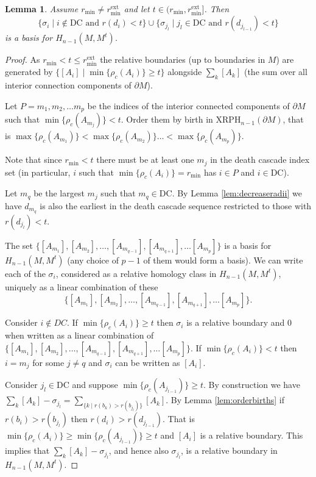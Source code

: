 \documentclass[a4paper,11pt]{article}
\newtheorem{lemma}[theorem]{Lemma}
\theoremstyle{definition}
\newcommand{\DC}{\text{DC}}
\newcommand{\ext}{\text{ext}}
\begin{document}
\begin{lemma}\label{lem:relativebasissmall}
Assume $r_{\min} \neq r_{\min}^{\ext}$ and let $t\in (r_{\min}, r_{\min}^{\ext}]$. Then $$\{\sigma_i \mid i\notin \DC \text{ and } r(d_i)< t\}\cup \{\sigma_{j_l} \mid {j_l}\in \DC \text{ and } r(d_{j_{l-1}})<t\} $$ is a basis for $H_{n-1}(M, M^t)$.
\end{lemma}  
\begin{proof}
As $r_{\min}< t \leq r_{\min}^{\ext}$ the relative boundaries (up to boundaries in $M$) are generated by $\{[A_i] \mid \min\{\rho_c(A_i)\}\geq t\}$ alongside $\sum_k [A_k]$ (the sum over all interior connection components of $\partial M$). 

Let $P=m_1, m_2, \ldots m_p$ be the indices of the interior connected components of $\partial M$ such that $\min \{\rho_c(A_{m_j})\}<t$. Order them by birth in $\mathrm{XRPH}_{n-1}(\partial M)$, that is $\max\{\rho_c(A_{m_1})\}<\max\{\rho_c(A_{m_2})\}\ldots <\max\{\rho_c(A_{m_p})\}$.

Note that since $r_{\min}<t$ there must be at least one $m_j$ in the death cascade index set (in particular, $i$ such that $\min\{\rho_c(A_i)\}=r_{\min}$ has $i\in P$ and $i\in \DC$). 

Let $m_q$ be the largest $m_j$ such that $m_q\in \DC$. By Lemma \ref{lem:decreaseradii} we have $d_{m_q}$ is also the earliest in the death cascade sequence restricted to those with $r(d_{j_l})< t$.

The set $\{[A_{m_1}], [A_{m_2}], \ldots , [A_{m_{q-1}}], [A_{m_{q+1}}], \ldots [A_{m_p}]\}$ is a basis for $H_{n-1}(M, M^t)$ (any choice of $p-1$ of them would form a basis). We can write each of the $\sigma_i$, considered as  a relative homology class in $H_{n-1}(M, M^t)$, uniquely as a linear combination of these $$\{[A_{m_1}], [A_{m_2}], \ldots , [A_{m_{q-1}}], [A_{m_{q+1}}], \ldots [A_{m_p}]\}.$$

Consider $i\notin DC$. If $\min \{\rho_c(A_i)\}\geq t$ then $\sigma_i$ is a relative boundary and $0$ when written as a linear combination of $\{[A_{m_1}], [A_{m_2}], \ldots , [A_{m_{q-1}}], [A_{m_{q+1}}], \ldots [A_{m_p}]\}$. If $\min \{\rho_c(A_i)\}< t$ then $i=m_j$ for some $j\neq q$ and $\sigma_i$ can be written as $[A_i]$.


Consider $j_l \in \DC$ and suppose $\min \{\rho_c(A_{j_{l-1}})\} \geq t$. 
By construction we have $\sum_k [A_k]-\sigma_{j_l}=\sum_{\{k\mid r(b_k)>r(b_{j_l})\}}[A_k]$. 
By Lemma \ref{lem:orderbirths} if $r(b_i)>r(b_{j_l})$ then $r(d_i)>r(d_{j_{l-1}})$. 
That is $\min\{\rho_c(A_i)\}\geq \min \{\rho_c(A_{j_{l-1}})\} \geq t$ and $[A_i]$ is a relative boundary. This implies that $\sum_k [A_k]-\sigma_{j_l}$, and hence also $\sigma_{j_l}$, is a relative boundary in $H_{n-1}(M, M^t)$.



\end{proof}
\end{document}
